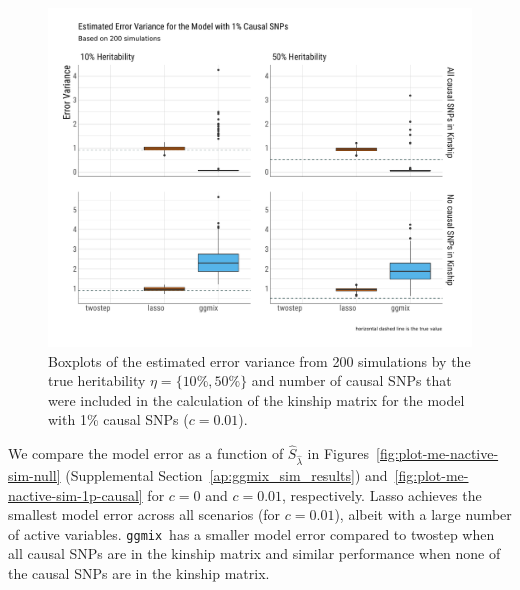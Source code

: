 \documentclass[12pt,letter]{article}\usepackage[]{graphicx}\usepackage[]{color}
\newenvironment{knitrout}{}{} %
\newcommand{\ggmix}{\texttt{ggmix}}
\begin{document}
\begin{knitrout}\scriptsize
{}\color{fgcolor}\begin{figure}[H]

{\centering \includegraphics[width=1\linewidth]{figure/plot-errorvar-sim-1p-causal-1} 

}

\caption[Boxplots of the estimated error variance from 200 simulations by the true heritability $\eta = \lbrace 10\%, 50\% \rbrace$ and number of causal SNPs that were included in the calculation of the kinship matrix for the model with 1\% causal SNPs ($c=0.01$)]{Boxplots of the estimated error variance from 200 simulations by the true heritability $\eta = \lbrace 10\%, 50\% \rbrace$ and number of causal SNPs that were included in the calculation of the kinship matrix for the model with 1\% causal SNPs ($c=0.01$).}\label{fig:plot-errorvar-sim-1p-causal}
\end{figure}


\end{knitrout}


We compare the model error as a function of $\widehat{S}_{\hat{\lambda}}$ in Figures~\ref{fig:plot-me-nactive-sim-null} (Supplemental Section~\ref{ap:ggmix_sim_results}) and~\ref{fig:plot-me-nactive-sim-1p-causal} for $c=0$ and $c=0.01$, respectively. Lasso achieves the smallest model error across all scenarios (for $c=0.01$), albeit with a large number of active variables. \ggmix ~has a smaller model error compared to twostep when all causal SNPs are in the kinship matrix and similar performance when none of the causal SNPs are in the kinship matrix.
\end{document}
